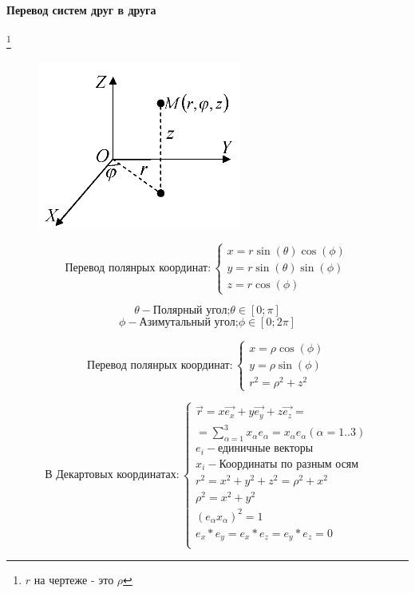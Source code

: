 \documentclass{article}
\begin{document}
\paragraph{Перевод систем друг в друга}\footnote{$r$ на чертеже - это $\rho$}

\begin{figure}[H]
\centering
\includegraphics[scale=3.00]{coordinates.png}
\caption{}
\label{}
\end{figure}

$$
\text{Перевод полянрых координат}:
\begin{cases}
x = r \sin(\theta) \cos(\phi) 
\\
y = r \sin(\theta) \sin(\phi)
\\
z = r \cos(\phi)
\end{cases}
$$

$$
\theta - \text{Полярный угол;} \theta \in [0;\pi]
$$
$$
\phi - \text{Азимутальный угол;} \phi \in [0; 2\pi] 
$$

$$
\text{Перевод полянрых координат}:
\begin{cases}
x = \rho \cos(\phi) 
\\
y = \rho \sin(\phi)
\\
r^2 = \rho^2 + z^2
\end{cases}
$$

$$
\text{В Декартовых координатах}:
\begin{cases}
\vec{r} = x\vec{e_x} + y\vec{e_y} + z\vec{e_z} = \\
=\displaystyle \sum_{\alpha = 1}^{3} x_\alpha e_\alpha = x_\alpha e_\alpha (\alpha =1..3)
\\
e_i - \text{единичные векторы}
\\
x_i - \text{Координаты по разным осям}
\\
r^2 = x^2 + y^2 + z^2 = \rho^2 + x^2
\\
\rho^2 = x^2 + y^2 
\\
(e_{\alpha}x_{\alpha})^2=1
\\
e_x*e_y = e_x*e_z = e_y*e_z = 0
\\
\end{cases}
$$
\end{document}
